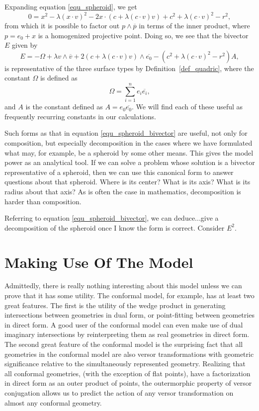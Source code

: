 \documentclass{ecgd-l}
\theoremstyle{definition}
\theoremstyle{remark}
\numberwithin{equation}{section}
\begin{document}
Expanding equation \eqref{equ_spheroid}, we get
\begin{equation}
0 = x^2 - \lambda(x\cdot v)^2 - 2x\cdot (c+\lambda(c\cdot v)v) + c^2 + \lambda(c\cdot v)^2 - r^2,
\end{equation}
from which it is possible to factor out $p\wedge\overline{p}$
in terms of the inner product, where $p=e_0+x$
is a homogenized projective point.  Doing so, we see that the bivector
$E$ given by
\begin{equation}\label{equ_spheroid_bivector}
E = -\Omega + \lambda v\wedge\overline{v} + 2(c+\lambda(c\cdot v)v)\wedge\overline{e_0} - (c^2+\lambda(c\cdot v)^2-r^2)A,
\end{equation}
is representative of the three surface types by Definition~\ref{def_quadric}, where the constant
$\Omega$ is defined as
\begin{equation}
\Omega=\sum_{i=1}^n e_i\overline{e_i},
\end{equation}
and $A$ is the constant defined as $A=e_0\overline{e_0}$.  We will find each of these useful as
frequently recurring constants in our calculations.

Such forms as that in equation \eqref{equ_spheroid_bivector} are useful, not only
for composition, but especially decomposition in the cases
where we have formulated what may, for example, be a spheroid by some other means.
This gives the model power as an analytical tool.  If we can solve a problem whose solution
is a bivector representative of a spheroid, then we can use this canonical form to answer
questions about that spheroid.  Where is its center?  What is its axis?  What is its radius
about that axis?  As is often the case in mathematics, decomposition is
harder than composition.

Referring to equation \eqref{equ_spheroid_bivector}, we can deduce...give
a decomposition of the spheroid once I know the form is correct.  Consider $E^2$.

\section{Making Use Of The Model}

Admittedly, there is really nothing interesting about this model unless we can
prove that it has some utility.  The conformal model, for example, has at least
two great features.  The first is the utility of the wedge product in generating
intersections between geometries in dual form, or point-fitting between
geometries in direct form.  A good user of the conformal model can even
make use of dual imaginary intersections by reinterpreting them as real geometries
in direct form.  The second great feature of the conformal model is the
surprising fact that all geometries in the conformal model are also versor transformations
with geometric significance relative to the simultaneously represented geometry.
Realizing that all conformal geometries, (with the exception of flat points), have
a factorization in direct form as an outer product of points, the outermorphic
property of versor conjugation allows us to predict the action of any versor
transformation on almost any conformal geometry.
\end{document}
